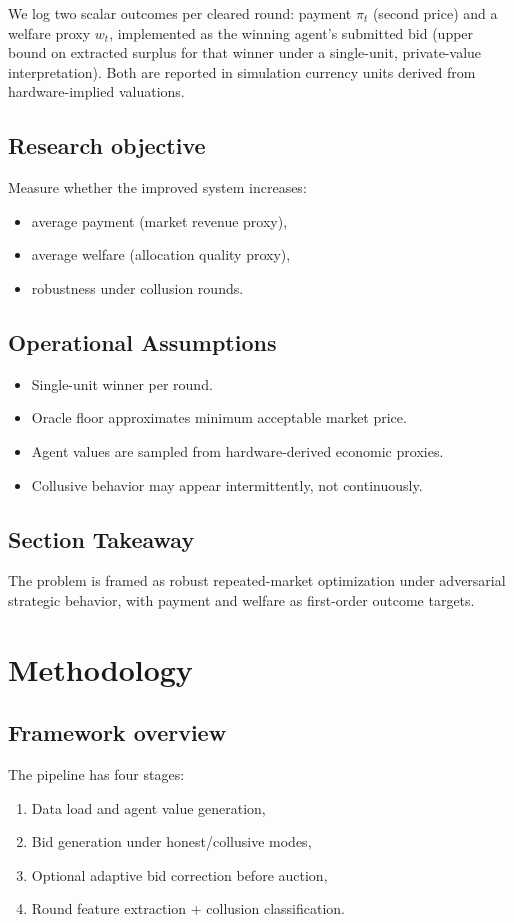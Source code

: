 \documentclass[journal]{IEEEtran}
\begin{document}
We log two scalar outcomes per cleared round: payment $\pi_t$ (second price) and a welfare proxy $w_t$, implemented as the winning agent's submitted bid (upper bound on extracted surplus for that winner under a single-unit, private-value interpretation). Both are reported in simulation currency units derived from hardware-implied valuations.

\subsection{Research objective}
Measure whether the improved system increases:
\begin{itemize}[leftmargin=*]
    \item average payment (market revenue proxy),
    \item average welfare (allocation quality proxy),
    \item robustness under collusion rounds.
\end{itemize}

\subsection{Operational Assumptions}
\begin{itemize}[leftmargin=*]
    \item Single-unit winner per round.
    \item Oracle floor approximates minimum acceptable market price.
    \item Agent values are sampled from hardware-derived economic proxies.
    \item Collusive behavior may appear intermittently, not continuously.
\end{itemize}

\subsection{Section Takeaway}
The problem is framed as robust repeated-market optimization under adversarial strategic behavior, with payment and welfare as first-order outcome targets.

\section{Methodology}
\subsection{Framework overview}
The pipeline has four stages:
\begin{enumerate}[leftmargin=*]
    \item Data load and agent value generation,
    \item Bid generation under honest/collusive modes,
    \item Optional adaptive bid correction before auction,
    \item Round feature extraction + collusion classification.
\end{enumerate}
\end{document}
